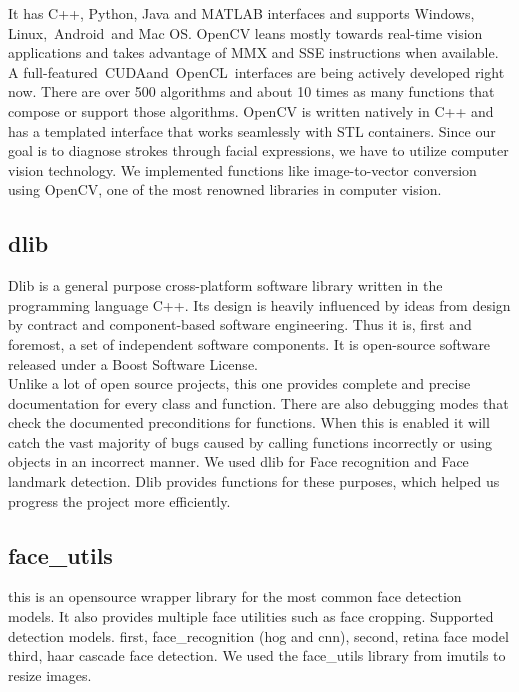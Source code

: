It has C++, Python, Java and MATLAB interfaces and supports Windows, Linux, Android and Mac OS. OpenCV leans mostly towards real-time vision applications and takes advantage of MMX and SSE instructions when available. A full-featured CUDAand OpenCL interfaces are being actively developed right now. There are over 500 algorithms and about 10 times as many functions that compose or support those algorithms. OpenCV is written natively in C++ and has a templated interface that works seamlessly with STL containers. Since our goal is to diagnose strokes through facial expressions, we have to utilize computer vision technology. We implemented functions like image-to-vector conversion using OpenCV, one of the most renowned libraries in computer vision.
\\


\subsection{\textbf{dlib}}
\cite{dlib} Dlib is a general purpose cross-platform software library written in the programming language C++. Its design is heavily influenced by ideas from design by contract and component-based software engineering. Thus it is, first and foremost, a set of independent software components. It is open-source software released under a Boost Software License.
\\

Unlike a lot of open source projects, this one provides complete and precise documentation for every class and function. There are also debugging modes that check the documented preconditions for functions. When this is enabled it will catch the vast majority of bugs caused by calling functions incorrectly or using objects in an incorrect manner.
We used dlib for Face recognition and Face landmark detection. Dlib provides functions for these purposes, which helped us progress the project more efficiently.\\

\subsection{\textbf{face\_utils}}
\cite{faceutil} this is an opensource wrapper library for the most common face detection models.
It also provides multiple face utilities such as face cropping.
Supported detection models. first, face\_recognition (hog and cnn), second, retina face model third, haar cascade face detection. We used the face\_utils library from imutils to resize images.\\

